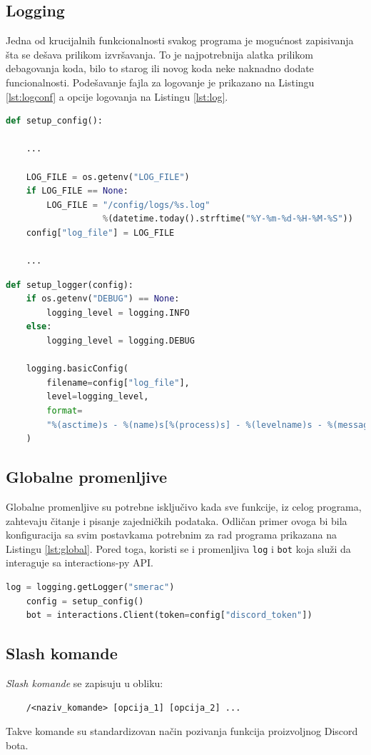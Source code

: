 \documentclass[a4paper,11pt]{article}
\begin{document}
\subsection{Logging}
Jedna od krucijalnih funkcionalnosti svakog programa je mogućnost zapisivanja šta se dešava prilikom izvršavanja. To je najpotrebnija alatka prilikom debagovanja koda, bilo to starog ili novog koda neke naknadno dodate funcionalnosti. Podešavanje fajla za logovanje je prikazano na Listingu \ref{lst:logconf} a opcije logovanja na Listingu \ref{lst:log}.
\begin{lstlisting}[language=Python, caption=Podešavanje fajla za logovanje, label=lst:logconf]
def setup_config():
    
    ...

    LOG_FILE = os.getenv("LOG_FILE")
    if LOG_FILE == None:
        LOG_FILE = "/config/logs/%s.log"
                   %(datetime.today().strftime("%Y-%m-%d-%H-%M-%S"))
    config["log_file"] = LOG_FILE
    
    ...
\end{lstlisting}
\begin{lstlisting}[language=Python, caption=Opcije loga, label=lst:log]
def setup_logger(config):
    if os.getenv("DEBUG") == None:
        logging_level = logging.INFO
    else:
        logging_level = logging.DEBUG

    logging.basicConfig(
        filename=config["log_file"],
        level=logging_level,
        format=
        "%(asctime)s - %(name)s[%(process)s] - %(levelname)s - %(message)s",
    )
\end{lstlisting}
\subsection{Globalne promenljive}
Globalne promenljive su potrebne isključivo kada sve funkcije, iz celog programa, zahtevaju čitanje i pisanje zajedničkih podataka. Odličan primer ovoga bi bila konfiguracija sa svim postavkama potrebnim za rad programa prikazana na Listingu \ref{lst:global}. Pored toga, koristi se i promenljiva \texttt{log} i \texttt{bot} koja služi da interaguje sa interactions-py API.
\begin{lstlisting}[language=Python, caption=Globalne promenljive, label=lst:global]
    log = logging.getLogger("smerac")
    config = setup_config()
    bot = interactions.Client(token=config["discord_token"])
\end{lstlisting}
\newpage
\subsection{Slash komande}
\textit{Slash komande} se zapisuju u obliku:
\begin{verbatim}
    /<naziv_komande> [opcija_1] [opcija_2] ...
\end{verbatim}
Takve komande su standardizovan način pozivanja funkcija proizvoljnog Discord bota.
\end{document}
